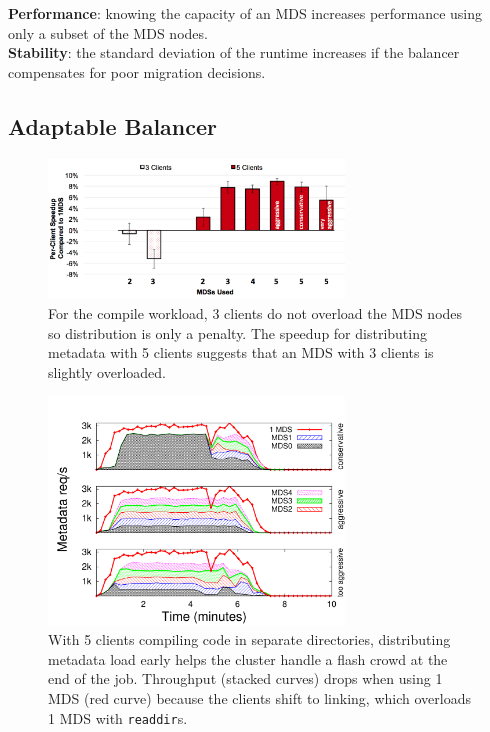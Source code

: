 \noindent\textbf{Performance}: knowing the capacity of an MDS increases performance using only a subset of the MDS nodes.\\
\noindent\textbf{Stability}: the standard deviation of the runtime increases if the balancer compensates for poor migration decisions.

\subsection{Adaptable Balancer}						%
\label{adaptable-balancer}								%
\begin{figure}[tbh]
	\centering	
	\includegraphics[width=0.7\textwidth]{./chapters/mantle/figures/eval_spill-evenly_compile_bar}\caption{For the compile workload, 3 clients do not overload the MDS nodes so distribution is only a penalty. The speedup for distributing metadata with 5 clients suggests that an MDS with 3 clients is slightly overloaded.  \label{figure:eval_spill-evenly_compile_bar}}
\end{figure}
\begin{figure}[tbh]
	\centering	
	\includegraphics[width=0.7\textwidth]{./chapters/mantle/figures/eval_spill-evenly_compile}\caption{With 5 clients compiling code in separate directories, distributing metadata load early helps the cluster handle a flash crowd at the end of the job. Throughput (stacked curves) drops when using 1 MDS (red curve) because the clients shift to linking, which overloads 1 MDS with \texttt{readdir}s.\label{figure:eval_spill-evenly_compile}}
\end{figure}

